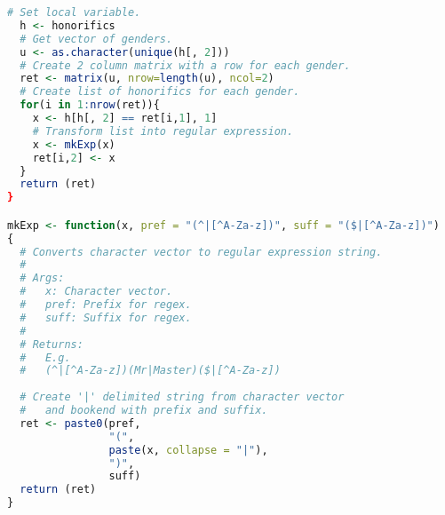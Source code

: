 \documentclass[a4paper, 11pt]{article}
\begin{document}
\begin{appendices}
\begin{lstlisting}[basicstyle=\small,language=R,showstringspaces=false]
  # Set local variable. 
  h <- honorifics
  # Get vector of genders.
  u <- as.character(unique(h[, 2]))
  # Create 2 column matrix with a row for each gender.
  ret <- matrix(u, nrow=length(u), ncol=2)
  # Create list of honorifics for each gender.
  for(i in 1:nrow(ret)){
    x <- h[h[, 2] == ret[i,1], 1]
    # Transform list into regular expression.
    x <- mkExp(x)
    ret[i,2] <- x
  }
  return (ret)
}

mkExp <- function(x, pref = "(^|[^A-Za-z])", suff = "($|[^A-Za-z])")
{
  # Converts character vector to regular expression string.
  #
  # Args:
  #   x: Character vector.
  #   pref: Prefix for regex.
  #   suff: Suffix for regex.
  #
  # Returns:
  #   E.g.
  #   (^|[^A-Za-z])(Mr|Master)($|[^A-Za-z])
  
  # Create '|' delimited string from character vector 
  #   and bookend with prefix and suffix.
  ret <- paste0(pref,
                "(",
                paste(x, collapse = "|"),
                ")",
                suff)
  return (ret)
}
\end{lstlisting}

\end{appendices}
\end{document}
